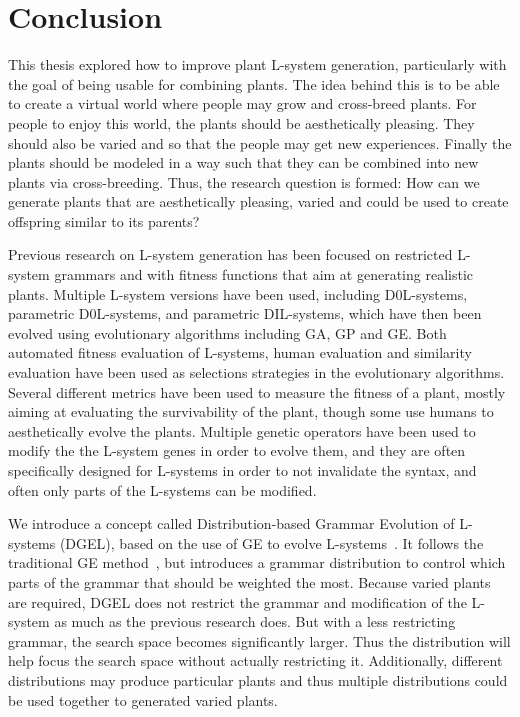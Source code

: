 \chapter{Conclusion}

This thesis explored how to improve plant \gls{L-system} generation, particularly with the goal of being usable for combining plants.
The idea behind this is to be able to create a virtual world where people may grow and cross-breed plants.
For people to enjoy this world, the plants should be aesthetically pleasing.
They should also be varied and so that the people may get new experiences.
Finally the plants should be modeled in a way such that they can be combined into new plants via cross-breeding.
Thus, the research question is formed: How can we generate plants that are aesthetically pleasing, varied and could be used to create offspring similar to its parents?

Previous research on \gls{L-system} generation has been focused on restricted \gls{L-system} grammars and with fitness functions that aim at generating realistic plants.
Multiple \gls{L-system} versions have been used, including D0L-systems, parametric D0L-systems, and parametric DIL-systems, which have then been evolved using evolutionary algorithms including \gls{GA}, \gls{GP} and \gls{GE}.
Both automated fitness evaluation of \glspl{L-system}, human evaluation and similarity evaluation have been used as selections strategies in the evolutionary algorithms.
Several different metrics have been used to measure the fitness of a plant, mostly aiming at evaluating the survivability of the plant, though some use humans to aesthetically evolve the plants.
Multiple genetic operators have been used to modify the the \gls{L-system} genes in order to evolve them, and they are often specifically designed for \glspl{L-system} in order to not invalidate the syntax, and often only parts of the \glspl{L-system} can be modified.

We introduce a concept called Distribution-based Grammar Evolution of \glspl{L-system} (DGEL), based on the use of \gls{GE} to evolve \glspl{L-system}~\cite{1998Ryan,2003Ortega,2009Beaumont}.
It follows the traditional \gls{GE} method~\cite{1998Ryan}, but introduces a grammar distribution to control which parts of the grammar that should be weighted the most.
Because varied plants are required, \gls{DGEL} does not restrict the grammar and modification of the \gls{L-system} as much as the previous research does.
But with a less restricting grammar, the search space becomes significantly larger.
Thus the distribution will help focus the search space without actually restricting it.
Additionally, different distributions may produce particular plants and thus multiple distributions could be used together to generated varied plants.

